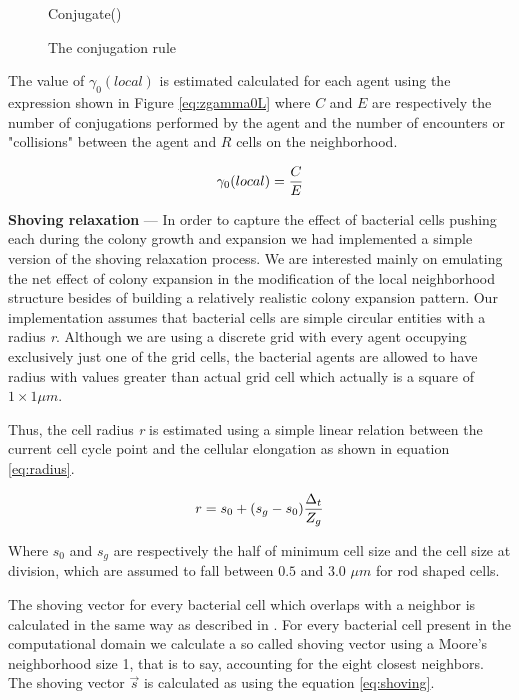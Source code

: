 \begin{figure}
\begin{algorithmic}[1]
		\State Conjugate()
	\EndIf
\EndIf
\EndProcedure
\end{algorithmic}
\caption[Conjugation]{\label{alg:conjugation}The conjugation rule}
\end{figure}

The value of $\gamma_0(local)$ is estimated calculated for each agent using the expression shown in Figure \eqref{eq:zgamma0L} where $C$ and $E$ are respectively the number of conjugations performed by the agent and the number of encounters or "collisions" between the agent and $R$ cells on the neighborhood.

\begin{equation}
\label{eq:zgamma0L}
\centering 
\gamma_0(local)= \frac{C}{E}
\end{equation}




{\bf Shoving relaxation} --- In order to capture the effect of bacterial cells pushing each during the colony growth and expansion we had implemented a simple version of the shoving relaxation process. We are interested mainly on emulating the net effect of colony expansion in the modification of the local neighborhood structure besides of building a relatively realistic colony expansion pattern.  Our implementation assumes that bacterial cells are simple circular entities with a radius {\it r}. Although we are using a discrete grid with every agent occupying exclusively just one of the grid cells, the bacterial agents are allowed to have radius  with values greater than actual grid cell which actually is a square of $1\times1 \mu m$. 

Thus, the cell radius {\it r} is estimated using a simple linear relation between the current cell cycle point and the cellular elongation as shown in equation \eqref{eq:radius}.

\begin{equation}
\label{eq:radius}
\centering 
r= s_0 +  (s_g - s_0) \frac{\Delta_t}{Z_g}
\end{equation}

Where $s_0$ and $s_g$ are respectively the half of minimum cell size and the cell size at division, which are assumed to fall between $0.5$ and $3.0$ $\mu m$ for rod shaped cells.  

The shoving vector for every bacterial cell which overlaps with a neighbor is calculated in the same way as described in \cite{citeulike:464384}.  For every bacterial cell present in the computational domain we calculate a so called shoving vector using a Moore's neighborhood size 1, that is to say, accounting for the eight closest neighbors.  The shoving vector $\vec{s}$ is calculated as using the equation \eqref{eq:shoving}.

